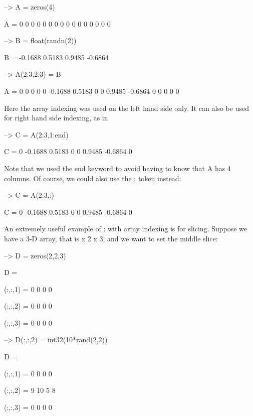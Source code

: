 \begin{DoxyVerbInclude}
--> A = zeros(4)

A = 
 0 0 0 0 
 0 0 0 0 
 0 0 0 0 
 0 0 0 0 

--> B = float(randn(2))

B = 
   -0.1688    0.5183 
    0.9485   -0.6864 

--> A(2:3,2:3) = B

A = 
         0         0         0         0 
         0   -0.1688    0.5183         0 
         0    0.9485   -0.6864         0 
         0         0         0         0 
\end{DoxyVerbInclude}


Here the array indexing was used on the left hand side only. It can also be used for right hand side indexing, as in


\begin{DoxyVerbInclude}
--> C = A(2:3,1:end)

C = 
         0   -0.1688    0.5183         0 
         0    0.9485   -0.6864         0 
\end{DoxyVerbInclude}


Note that we used the {\ttfamily end} keyword to avoid having to know that {\ttfamily A} has 4 columns. Of course, we could also use the {\ttfamily \-:} token instead\-:


\begin{DoxyVerbInclude}
--> C = A(2:3,:)

C = 
         0   -0.1688    0.5183         0 
         0    0.9485   -0.6864         0 
\end{DoxyVerbInclude}


An extremely useful example of {\ttfamily \-:} with array indexing is for slicing. Suppose we have a 3-\/\-D array, that is { x 2 x 3}, and we want to set the middle slice\-:


\begin{DoxyVerbInclude}
--> D = zeros(2,2,3)

D = 

(:,:,1) = 
 0 0 
 0 0 

(:,:,2) = 
 0 0 
 0 0 

(:,:,3) = 
 0 0 
 0 0 

--> D(:,:,2) = int32(10*rand(2,2))

D = 

(:,:,1) = 
  0  0 
  0  0 

(:,:,2) = 
  9 10 
  5  8 

(:,:,3) = 
  0  0 
  0  0 
\end{DoxyVerbInclude}


